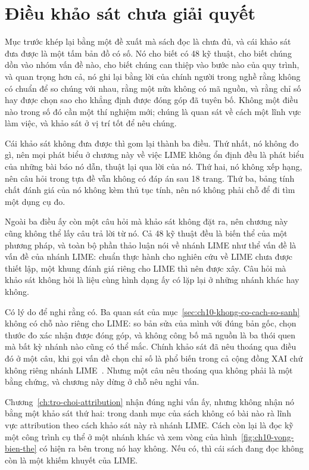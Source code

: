 \section{Điều khảo sát chưa giải quyết}
\label{sec:ch10-dieu-chua-giai-quyet}

Mục trước khép lại bằng một đề xuất mà sách đọc là chưa đủ, và cái khảo sát
đưa được là một tấm bản đồ có số. Nó cho biết có 48 kỹ thuật, cho
biết chúng dồn vào nhóm vấn đề nào, cho biết chúng can thiệp vào bước nào của
quy trình, và quan trọng hơn cả, nó ghi lại bằng lời của chính người trong nghề
rằng không có chuẩn để so chúng với nhau, rằng một nửa không có mã nguồn, và
rằng chỉ số hay được chọn sao cho khẳng định được đóng góp đã tuyên bố. Không
một điều nào trong số đó cần một thí nghiệm mới; chúng là quan sát về cách một
lĩnh vực làm việc, và khảo sát ở vị trí tốt để nêu chúng.

Cái khảo sát không đưa được thì gom lại thành ba điều. Thứ nhất, nó không đo gì,
nên mọi phát biểu ở chương này về việc LIME không ổn định đều là phát biểu của
những bài báo nó dẫn, thuật lại qua lời của nó. Thứ hai, nó không xếp hạng, nên câu hỏi
trong tựa đề vẫn không có đáp án sau 18 trang. Thứ ba, bảng tính chất đánh giá
của nó không kèm thủ tục tính, nên nó không phải chỗ để đi tìm một dụng cụ đo.

Ngoài ba điều ấy còn một câu hỏi mà khảo sát không đặt ra, nên chương này cũng
không thể lấy câu trả lời từ nó. Cả 48 kỹ thuật đều là biến thể của một phương
pháp, và toàn bộ phần
thảo luận nói về nhánh LIME như thể vấn đề là vấn đề của nhánh LIME: chuẩn thực
hành cho nghiên cứu về LIME chưa được thiết lập, một khung đánh giá riêng cho
LIME thì nên được xây. Câu hỏi mà khảo sát không hỏi là liệu cùng hình dạng ấy
có lặp lại ở những nhánh khác hay không.

Có lý do để nghi rằng có. Ba quan sát của mục~\ref{sec:ch10-khong-co-cach-so-sanh}
không có chỗ nào riêng cho LIME: so bản sửa của mình với đúng bản gốc, chọn thước
đo xác nhận được đóng góp, và không công bố mã nguồn là ba thói quen mà bất kỳ
nhánh nào cũng có thể mắc. Chính khảo sát đã nêu thoáng qua điều đó ở một câu, khi gọi vấn
đề chọn chỉ số là phổ biến trong cả cộng đồng XAI chứ không riêng nhánh
LIME~\autocite{p22whichlime}. Nhưng một câu nêu thoáng qua không phải là một
bằng chứng, và
chương này dừng ở chỗ nêu nghi vấn.

Chương~\ref{ch:tro-choi-attribution} nhận đúng nghi vấn ấy, nhưng không nhận nó
bằng một khảo sát thứ hai: trong danh mục của sách không có bài nào rà lĩnh vực
attribution theo cách khảo sát này rà nhánh LIME. Cách còn lại là đọc kỹ một
công trình cụ thể ở một nhánh khác và xem vòng của
hình~\ref{fig:ch10-vong-bien-the} có hiện ra bên trong nó hay không. Nếu có,
thì cái sách đang đọc không còn là một khiếm khuyết của LIME.

%
